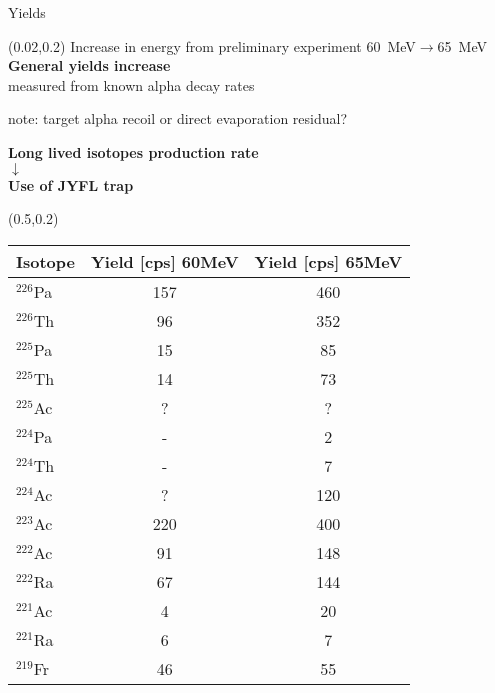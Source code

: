 \documentclass[10pt,aspectratio=169]{beamer}
\begin{document}
\begin{frame}{Yields}
		\begin{textblock*}{0.5\paperwidth}(0.02\paperwidth,0.2\paperheight)
			\centering
			Increase in energy from preliminary experiment
			60~MeV$\rightarrow$65~MeV\\
			\vspace{0.04\textheight}
			\textbf{General yields increase}\\
			measured from known alpha decay rates
			\vspace{0.04\textheight}

			note: target alpha recoil or direct evaporation residual?\\
			\vspace{0.07\textheight}
			
			\textbf{Long lived isotopes production rate}\\
			$\downarrow$\\
			\textbf{Use of JYFL trap}\\	
		\end{textblock*}
		\begin{textblock*}{0.8\paperwidth}(0.5\paperwidth,0.2\paperheight)
			\small
			\begin{tabular}[5pt]{ l  c  c }
				Isotope &Yield [cps] 60MeV& Yield [cps] 65MeV\\
				\hline
				$^{226}$Pa&	157	    &460 \\
				$^{226}$Th&	96      &352 \\
				$^{225}$Pa&	15      &85 \\
				$^{225}$Th&	14      &73 \\
				$^{225}$Ac&	?       &? \\
				$^{224}$Pa&	-       &2 \\
				$^{224}$Th&	-       &7 \\
				$^{224}$Ac&	?       &120 \\
				$^{223}$Ac&	220     &400 \\
				$^{222}$Ac&	91      &148 \\
				$^{222}$Ra&	67      &144 \\
				$^{221}$Ac&	4       &20 \\
				$^{221}$Ra&	6       &7 \\
				$^{219}$Fr&	46      &55 \\
			\end{tabular}
		\end{textblock*}
\end{frame} 
\end{document}
